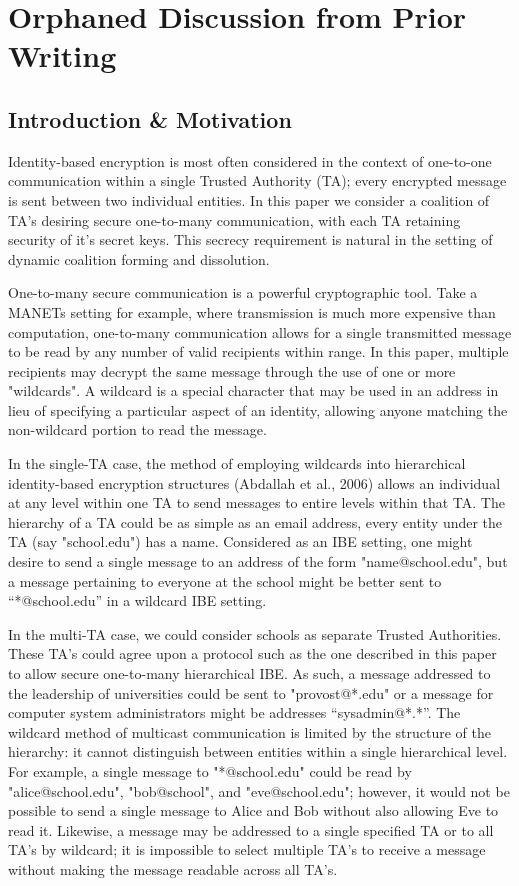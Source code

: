 \documentclass[10pt]{llncs}
\begin{document}
	
	
\section{Orphaned Discussion from Prior Writing}

	\subsection{Introduction \& Motivation}
	Identity-based encryption is most often considered in the context of one-to-one communication within a single Trusted Authority (TA); every encrypted message is sent between two individual entities.  In this paper we consider a coalition of TA's desiring secure one-to-many communication, with each TA retaining security of it's secret keys.  This secrecy requirement is natural in the setting of dynamic coalition forming and dissolution.

	One-to-many secure communication is a powerful cryptographic tool.  Take a MANETs setting for example, where transmission is much more expensive than computation, one-to-many communication allows for a single transmitted message to be read by any number of valid recipients within range.  In this paper, multiple recipients may decrypt the same message through the use of one or more "wildcards". A wildcard is a special character that may be used in an address in lieu of specifying a particular aspect of an identity, allowing anyone matching the non-wildcard portion to read the message.

	In the single-TA case, the method of employing wildcards into hierarchical identity-based encryption structures (Abdallah et al., 2006) allows an individual at any level within one TA to send messages to entire levels within that TA.  The hierarchy of a TA could be as simple as an email address, every entity under the TA (say "school.edu") has a name. Considered as an IBE setting, one might desire to send a single message to an address of the form "name@school.edu", but a message pertaining to everyone at the school might be better sent to “*@school.edu” in a wildcard IBE setting. 

	In the multi-TA case, we could consider schools as separate Trusted Authorities.  These TA's could agree upon a protocol such as the one described in this paper to allow secure one-to-many hierarchical IBE.  As such, a message addressed to the leadership of universities could be sent to "provost@*.edu" or a message for computer system administrators might be addresses “sysadmin@*.*”.  The wildcard method of multicast communication is limited by the structure of the hierarchy: it cannot distinguish between entities within a single hierarchical level.  For example, a single message to "*@school.edu" could be read by "alice@school.edu", "bob@school", and "eve@school.edu"; however, it would not be possible to send a single message to Alice and Bob without also allowing Eve to read it. Likewise, a message may be addressed to a single specified TA or to all TA's by wildcard; it is impossible to select multiple TA's to receive a message without making the message readable across all TA's.
\end{document}
